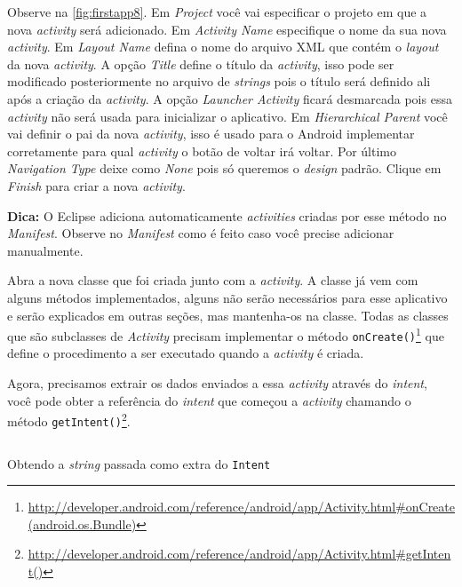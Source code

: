 \documentclass[a4paper,12pt,brazil,oneside]{book}
\begin{document}
Observe na \autoref{fig:firstapp8}. Em \emph{Project} você vai especificar o projeto em que a nova \emph{activity} será adicionado. Em \emph{Activity Name} especifique o nome da sua nova \emph{activity}. Em \emph{Layout Name} defina o nome do arquivo XML que contém o \emph{layout} da nova \emph{activity}. A opção \emph{Title} define o título da \emph{activity}, isso pode ser modificado posteriormente no arquivo de \emph{strings} pois o título será definido ali após a criação da \emph{activity}. A opção \emph{Launcher Activity} ficará desmarcada pois essa \emph{activity} não será usada para inicializar o aplicativo. Em \emph{Hierarchical Parent} você vai definir o pai da nova \emph{activity}, isso é usado para o Android implementar corretamente para qual \emph{activity} o botão de voltar irá voltar. Por último \emph{Navigation Type} deixe como \emph{None} pois só queremos o \emph{design} padrão. Clique em \emph{Finish} para criar a nova \emph{activity}.
 
\begin{framed}
\textbf{Dica:} O Eclipse adiciona automaticamente \emph{activities} criadas por esse método no \emph{Manifest}. Observe no \emph{Manifest} como é feito caso você precise adicionar manualmente.
\end{framed}

Abra a nova classe que foi criada junto com a \emph{activity}. A classe já vem com alguns métodos implementados, alguns não serão necessários para esse aplicativo e serão explicados em outras seções, mas mantenha-os na classe. Todas as classes que são subclasses de \emph{Activity} precisam implementar o método \texttt{onCreate()}\footnote{\href{http://developer.android.com/reference/android/app/Activity.html\#onCreate(android.os.Bundle)}{http://developer.android.com/reference/android/app/Activity.html\#onCreate(android.os.Bundle)}} que define o procedimento a ser executado quando a \emph{activity} é criada.

Agora, precisamos extrair os dados enviados a essa \emph{activity} através do \emph{intent}, você pode obter a referência do \emph{intent} que começou a \emph{activity} chamando o método \texttt{getIntent()}\footnote{\href{http://developer.android.com/reference/android/app/Activity.html\#getIntent()}{http://developer.android.com/reference/android/app/Activity.html\#getIntent()}}.

\begin{listing}[H]
\inputminted[linenos=true,fontsize=\small,frame=lines, framesep=2mm, tabsize=2,numbersep=5pt]{java}{src/firstapp/8.java}
\caption{Obtendo a \emph{string} passada como extra do \texttt{Intent}}
\label{code:obtendo-string-intent}
\end{listing}
\end{document}

